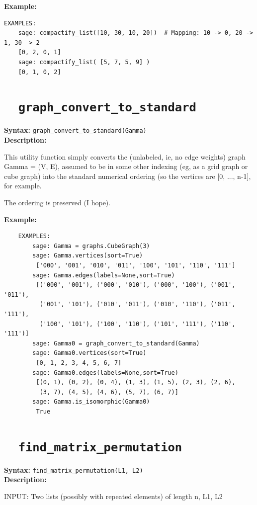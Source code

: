 \documentclass{article}
\begin{document}
\textbf{Example:}
\begin{verbatim}
EXAMPLES:
    sage: compactify_list([10, 30, 10, 20])  # Mapping: 10 -> 0, 20 -> 1, 30 -> 2
    [0, 2, 0, 1]
    sage: compactify_list( [5, 7, 5, 9] ) 
    [0, 1, 0, 2]
\end{verbatim}

\section{\tt \ \ graph\_convert\_to\_standard}

\textbf{Syntax:} \verb}graph_convert_to_standard(Gamma)}\\

\textbf{Description:}

This utility function simply converts the (unlabeled,
    ie, no edge weights) graph Gamma = (V, E), assumed 
    to be in some other indexing (eg, as a grid graph or cube graph) 
    into the standard numerical ordering (so the vertices are
[0, ..., n-1], for example.

    The ordering is preserved (I hope).

\textbf{Example:}
\begin{verbatim}
    EXAMPLES:
        sage: Gamma = graphs.CubeGraph(3)    
        sage: Gamma.vertices(sort=True)
         ['000', '001', '010', '011', '100', '101', '110', '111']
        sage: Gamma.edges(labels=None,sort=True)
         [('000', '001'), ('000', '010'), ('000', '100'), ('001', '011'),
          ('001', '101'), ('010', '011'), ('010', '110'), ('011', '111'),
          ('100', '101'), ('100', '110'), ('101', '111'), ('110', '111')]
        sage: Gamma0 = graph_convert_to_standard(Gamma)
        sage: Gamma0.vertices(sort=True)
         [0, 1, 2, 3, 4, 5, 6, 7]
        sage: Gamma0.edges(labels=None,sort=True)
         [(0, 1), (0, 2), (0, 4), (1, 3), (1, 5), (2, 3), (2, 6),
          (3, 7), (4, 5), (4, 6), (5, 7), (6, 7)]
        sage: Gamma.is_isomorphic(Gamma0)
         True
\end{verbatim}

\section{\tt \ \ find\_matrix\_permutation}

\textbf{Syntax:} \verb}find_matrix_permutation(L1, L2)}\\

\textbf{Description:}

\noindent
INPUT: Two lists (possibly with repeated elements) of length n, L1, L2
\end{document}
